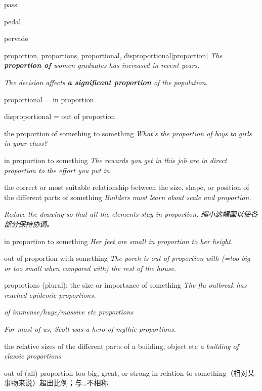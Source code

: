 \begin{DefWord}{pass}
\end{DefWord}

\begin{DefWord}{pedal}
\end{DefWord}

\begin{DefWord}{pervade}
\end{DefWord}

\begin{DefWord}{proportion, proportions, proportional, disproportional}[proportion]
    \textit{The \textbf{proportion of} women graduates has increased in recent years.}

    \textit{The decision affects \textbf{a significant proportion} of the population.}

    proportional = in proportion

    disproportional = out of proportion


the proportion of something to something
\textit{What's the proportion of boys to girls in your class?}

in proportion to something
\textit{The rewards you get in this job are in direct proportion to the effort you put in.}

the correct or most suitable relationship between the size, shape, or position of the different parts of something
\textit{Builders must learn about scale and proportion.}

\textit{Reduce the drawing so that all the elements stay in proportion. 缩小这幅画以使各部分保持协调。 }

in proportion to something
\textit{Her feet are small in proportion to her height.}

out of proportion with something
\textit{The porch is out of proportion with (=too big or too small when compared with) the rest of the house.}

proportions (plural):
the size or importance of something
\textit{The flu outbreak has reached epidemic proportions.}

\textit{of immense/huge/massive etc proportions}

\textit{For most of us, Scott was a hero of mythic proportions.}

the relative sizes of the different parts of a building, object etc
\textit{a building of classic proportions}

out of (all) proportion too big, great, or strong in relation to something（相对某事物来说）超出比例；与…不相称


\end{DefWord}
